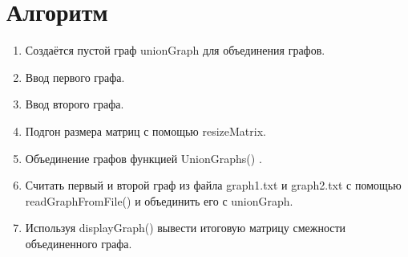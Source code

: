 \documentclass[12pt]{article}
\begin{document}
\section*{Алгоритм}
\begin{enumerate}
    \item Создаётся пустой граф unionGraph для объединения графов.
    \item Ввод первого графа.
    \item Ввод второго графа.
    \item Подгон размера матриц с помощью resizeMatrix.
    \item Объединение графов функцией UnionGraphs() .
    \item Считать первый и второй граф из файла graph1.txt и graph2.txt с помощью readGraphFromFile() и объединить его с unionGraph.
    \item Используя displayGraph() вывести итоговую матрицу смежности объединенного графа.
    
\end{enumerate}
\end{document}
